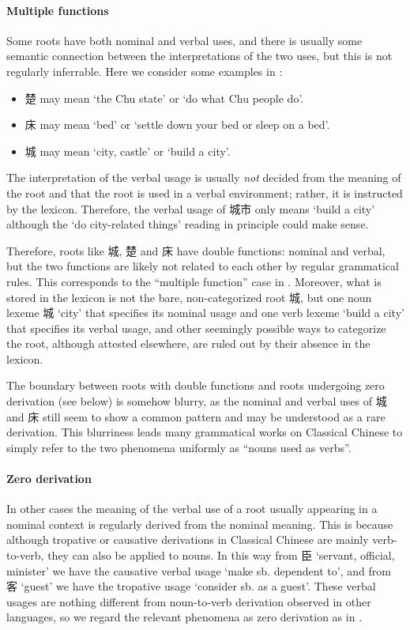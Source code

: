 \documentclass[UTF8, a4paper, oneside, scheme=plain, 12pt]{ctexrep}
\newcommand*{\citesec}[1]{\S~{#1}}
\newcommand{\translate}[1]{`#1'}
\begin{document}
\paragraph*{Multiple functions}
Some roots have both nominal and verbal uses,
and there is usually some semantic connection between the interpretations of the two uses,
but this is not regularly inferrable. 
Here we consider some examples in \citet{yang1991dict}:
\begin{itemize}
    \item 楚 may mean \translate{the Chu state} or \translate{do what Chu people do}.
    \item 床 may mean \translate{bed} or \translate{settle down your bed or sleep on a bed}.
    \item 城 may mean \translate{city, castle} or \translate{build a city}.
\end{itemize}
The interpretation of the verbal usage is usually \emph{not} decided
from the meaning of the root and that the root is used in a verbal environment;
rather, it is instructed by the lexicon.
Therefore, the verbal usage of 城市 only means \translate{build a city}
although the \translate{do city-related things} reading in principle could make sense. 

Therefore, roots like 城, 楚 and 床 have double functions: nominal and verbal,
but the two functions are likely not related to each other by regular grammatical rules.
This corresponds to the ``multiple function'' case in \citet[\citesec{11.3}]{dixon2010basic2}.
Moreover, what is stored in the lexicon is not the bare, non-categorized root 城,
but one noun lexeme 城 \translate{city} that specifies its nominal usage 
and one verb lexeme \translate{build a city} that specifies its verbal usage,
and other seemingly possible ways to categorize the root, although attested elsewhere,
are ruled out by their absence in the lexicon.

The boundary between roots with double functions and roots undergoing zero derivation (see below) 
is somehow blurry,
as the nominal and verbal uses of 城 and 床 still seem to show a common pattern
and may be understood as a rare derivation.
This blurriness leads many grammatical works on Classical Chinese 
to simply refer to the two phenomena uniformly as ``nouns used as verbs''.

\paragraph*{Zero derivation}
In other cases the meaning of the verbal use of a root usually appearing in a nominal context
is regularly derived from the nominal meaning.
This is because although tropative or causative derivations in Classical Chinese
are mainly verb-to-verb,
they can also be applied to nouns.
In this way from 臣 \translate{servant, official, minister}
we have the causative verbal usage \translate{make sb. dependent to},
and from 客 \translate{guest} we have the tropative usage \translate{consider sb. as a guest}.
These verbal usages are nothing different from noun-to-verb derivation observed in other languages,
so we regard the relevant phenomena as zero derivation as in \citet[\citesec{11.3}]{dixon2010basic2}.
\end{document}
